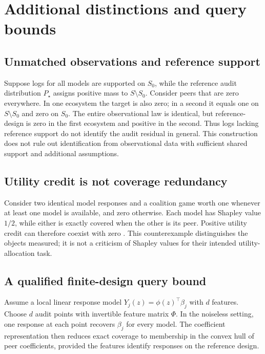 \section{Additional distinctions and query bounds}
\label{app:additional-theory}

\subsection{Unmatched observations and reference support}
Suppose logs for all models are supported on $S_0$, while the reference audit distribution $P_\star$ assigns positive mass to $S\setminus S_0$. Consider peers that are zero everywhere. In one ecosystem the target is also zero; in a second it equals one on $S\setminus S_0$ and zero on $S_0$. The entire observational law is identical, but reference-design \PIER is zero in the first ecosystem and positive in the second. Thus logs lacking reference support do not identify the audit residual in general. This construction does not rule out identification from observational data with sufficient shared support and additional assumptions.

\subsection{Utility credit is not coverage redundancy}
Consider two identical model responses and a coalition game worth one whenever at least one model is available, and zero otherwise. Each model has Shapley value $1/2$, while either is exactly covered when the other is its peer. Positive utility credit can therefore coexist with zero \PIER. This counterexample distinguishes the objects measured; it is not a criticism of Shapley values for their intended utility-allocation task.

\subsection{A qualified finite-design query bound}
Assume a local linear response model $Y_j(z)=\phi(z)^\top\beta_j$ with $d$ features. Choose $d$ audit points with invertible feature matrix $\Phi$. In the noiseless setting, one response at each point recovers $\beta_j$ for every model. The coefficient representation then reduces exact coverage to membership in the convex hull of peer coefficients, provided the features identify responses on the reference design.


